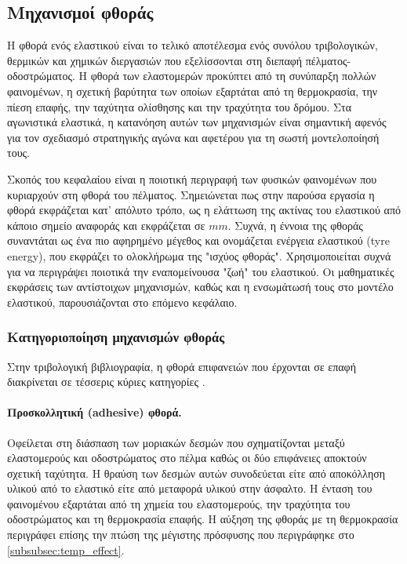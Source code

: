 \subsection{Μηχανισμοί φθοράς}

Η φθορά ενός ελαστικού είναι το τελικό αποτέλεσμα ενός συνόλου τριβολογικών, θερμικών
και χημικών διεργασιών που εξελίσσονται στη διεπαφή πέλματος-οδοστρώματος. Η φθορά 
των ελαστομερών προκύπτει από τη συνύπαρξη πολλών φαινομένων, η
σχετική βαρύτητα των οποίων εξαρτάται από τη θερμοκρασία, την πίεση επαφής, την ταχύτητα
ολίσθησης και την τραχύτητα του δρόμου. Στα αγωνιστικά ελαστικά, η κατανόηση αυτών των μηχανισμών
είναι σημαντική αφενός για τον σχεδιασμό στρατηγικής αγώνα και αφετέρου για τη σωστή μοντελοποίησή
τους.

Σκοπός του κεφαλαίου είναι η ποιοτική περιγραφή των φυσικών φαινομένων που κυριαρχούν στη
φθορά του πέλματος. Σημειώνεται πως στην παρούσα εργασία η φθορά εκφράζεται κατ' απόλυτο τρόπο, 
ως η ελάττωση της ακτίνας του ελαστικού από κάποιο σημείο αναφοράς και εκφράζεται σε 
$mm$. Συχνά, η έννοια της φθοράς συναντάται ως ένα πιο αφηρημένο μέγεθος και ονομάζεται
ενέργεια ελαστικού (tyre energy), που εκφράζει το ολοκλήρωμα της "ισχύος φθοράς".
Χρησιμοποιείται συχνά για να περιγράψει ποιοτικά την εναπομείνουσα "ζωή" του ελαστικού.
Οι μαθηματικές εκφράσεις των αντίστοιχων μηχανισμών, καθώς και η
ενσωμάτωσή τους στο μοντέλο ελαστικού, παρουσιάζονται στο επόμενο κεφάλαιο.

\subsubsection{Κατηγοριοποίηση μηχανισμών φθοράς}
\label{subsubsec:wear_classes}

Στην τριβολογική βιβλιογραφία, η φθορά επιφανειών
που έρχονται σε επαφή διακρίνεται σε τέσσερις κύριες κατηγορίες \cite{WangKTH2017,Grosch1963}.

\paragraph{Προσκολλητική (adhesive) φθορά.}
Οφείλεται στη διάσπαση των μοριακών δεσμών που σχηματίζονται μεταξύ ελαστομερούς και οδοστρώματος στο
πέλμα καθώς οι δύο επιφάνειες αποκτούν σχετική ταχύτητα. Η θραύση των
δεσμών αυτών συνοδεύεται είτε από αποκόλληση υλικού από το ελαστικό είτε από μεταφορά
υλικού στην άσφαλτο. Η ένταση του φαινομένου εξαρτάται από τη χημεία του ελαστομερούς,
την τραχύτητα του οδοστρώματος και τη θερμοκρασία επαφής. Η αύξηση της φθοράς με τη 
θερμοκρασία περιγράφει επίσης την πτώση της μέγιστης πρόσφυσης που περιγράφηκε στο 
\cref{subsubsec:temp_effect}.

